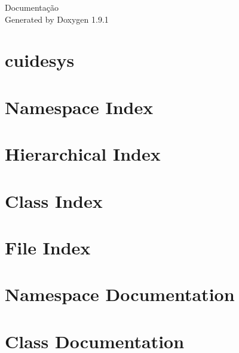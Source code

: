 \let\mypdfximage\pdfximage\def\pdfximage{\immediate\mypdfximage}\documentclass[twoside]{book}
\newcommand{\+}{\discretionary{\mbox{\scriptsize$\hookleftarrow$}}{}{}}
\newcommand{\clearemptydoublepage}{%
  \newpage{\pagestyle{empty}\cleardoublepage}%
}
\begin{document}
\raggedbottom

\hypersetup{pageanchor=false,
             bookmarksnumbered=true,
             pdfencoding=unicode
            }
\begin{titlepage}
\vspace*{7cm}
\begin{center}%
{\Large Documentação }\\
\vspace*{1cm}
{\large Generated by Doxygen 1.9.1}\\
\end{center}
\end{titlepage}
\clearemptydoublepage
{}
\tableofcontents
\clearemptydoublepage
{}
\hypersetup{pageanchor=true}

\chapter{cuidesys}
\label{md__r_e_a_d_m_e}

\chapter{Namespace Index}

\chapter{Hierarchical Index}

\chapter{Class Index}

\chapter{File Index}

\chapter{Namespace Documentation}

\chapter{Class Documentation}
























\end{document}
